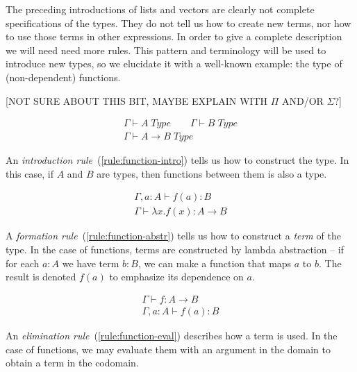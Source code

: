 The preceding introductions of lists and vectors are clearly not complete specifications
of the types. They do not tell us how to create new terms, nor how to use those
terms in other expressions. In order to give a complete description we will need
need more rules. This pattern and terminology will be used to introduce new
types, so we elucidate it with a well-known example: the type of (non-dependent)
functions.

[NOT SURE ABOUT THIS BIT, MAYBE EXPLAIN WITH $\Pi$ AND/OR $\Sigma$?]

\begin{equation}
  \begin{array}{c}
    \Gamma \vdash A \; Type \qquad \Gamma \vdash B \; Type\\
    \hline
    \Gamma \vdash A \rightarrow B \; Type
  \end{array}
  \label{rule:function-intro}
\end{equation}

An \emph{introduction rule}~(\ref{rule:function-intro}) tells us how to construct
the type. In this case, if $A$ and $B$ are types, then functions between them is
also a type.

\begin{equation}
  \begin{array}{c}
    \Gamma, a : A \vdash f(a) : B\\
    \hline
    \Gamma \vdash \lambda x . f(x) : A \rightarrow B
  \end{array}
  \label{rule:function-abstr}
\end{equation}

A \emph{formation rule}~(\ref{rule:function-abstr}) tells us how to construct a
\emph{term} of the type. In the case of functions, terms are constructed by
lambda abstraction -- if for each $a:A$ we have term $b:B$, we can make a
function that maps $a$ to $b$. The result is denoted $f(a)$ to emphasize its
dependence on $a$.

\begin{equation}
  \begin{array}{c}
    \Gamma \vdash f : A \rightarrow B\\
    \hline
    \Gamma, a : A \vdash f(a) : B
  \end{array}
  \label{rule:function-eval}
\end{equation}

An \emph{elimination rule}~(\ref{rule:function-eval}) describes how a term is
used. In the case of functions, we may evaluate them with an argument in the
domain to obtain a term in the codomain.

